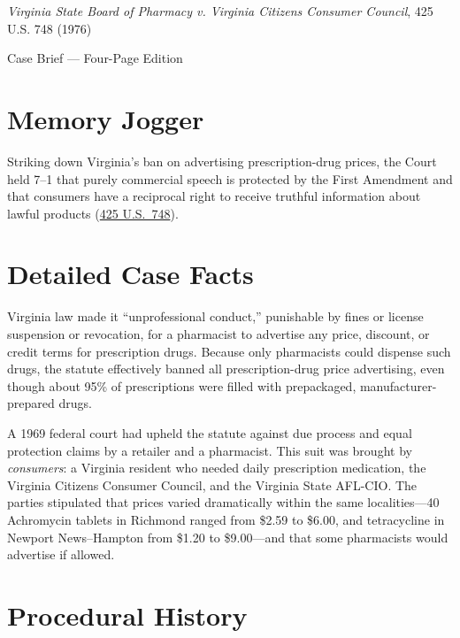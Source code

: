 \documentclass[12pt]{article}
\begin{document}
\begin{center}
{\LARGE \textit{Virginia State Board of Pharmacy v. Virginia Citizens Consumer Council}, 425 U.S. 748 (1976)\par}
\vspace{0.8em}
{\large Case Brief --- Four-Page Edition\par}
\end{center}
\vspace{1em}

\section{Memory Jogger}

Striking down Virginia's ban on advertising prescription-drug prices, the Court held 7--1 that purely commercial speech is protected by the First Amendment and that consumers have a reciprocal right to receive truthful information about lawful products (\href{https://supreme.justia.com/cases/federal/us/425/748/}{425 U.S.\ 748}).

\section{Detailed Case Facts}

Virginia law made it ``unprofessional conduct,'' punishable by fines or license suspension or revocation, for a pharmacist to advertise any price, discount, or credit terms for prescription drugs. Because only pharmacists could dispense such drugs, the statute effectively banned all prescription-drug price advertising, even though about 95\% of prescriptions were filled with prepackaged, manufacturer-prepared drugs.

A 1969 federal court had upheld the statute against due process and equal protection claims by a retailer and a pharmacist. This suit was brought by \emph{consumers}: a Virginia resident who needed daily prescription medication, the Virginia Citizens Consumer Council, and the Virginia State AFL-CIO. The parties stipulated that prices varied dramatically within the same localities---40 Achromycin tablets in Richmond ranged from \$2.59 to \$6.00, and tetracycline in Newport News--Hampton from \$1.20 to \$9.00---and that some pharmacists would advertise if allowed.

\section{Procedural History}
\end{document}
